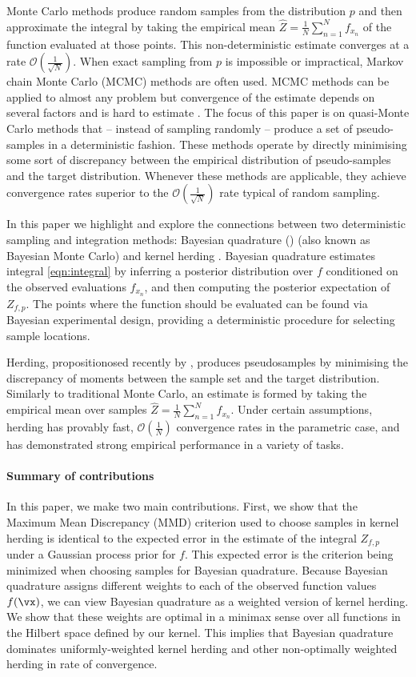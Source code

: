 Monte Carlo methods produce random samples from the distribution $p$ and then approximate the integral by taking the empirical mean $\hat{Z} = \frac{1}{N}\sum_{n=1}^{N}f_{x_n}$ of the function evaluated at those points. This non-deterministic estimate converges at a rate $\mathcal{O}(\frac{1}{\sqrt{N}})$. When exact sampling from $p$ is impossible or impractical, Markov chain Monte Carlo (MCMC) methods are often used. MCMC methods can be applied to almost any problem but convergence of the estimate depends on several factors and is hard to estimate \citep{CowlesCarlin96}. The focus of this paper is on quasi-Monte Carlo methods that -- instead of sampling randomly -- produce a set of pseudo-samples in a deterministic fashion. These methods operate by directly minimising some sort of discrepancy between the empirical distribution of pseudo-samples and the target distribution. Whenever these methods are applicable, they achieve convergence rates superior to the $\mathcal{O}(\frac{1}{\sqrt{N}})$ rate typical of random sampling.

In this paper we highlight and explore the connections between two deterministic sampling and integration methods: Bayesian quadrature (\bq{}) \citep{BZHermiteQuadrature,BZMonteCarlo} (also known as Bayesian Monte Carlo) and kernel herding \citep{chen2010super}. Bayesian quadrature estimates integral \eqref{eqn:integral} by inferring a posterior distribution over $f$ conditioned on the observed evaluations $f_{x_n}$, and then computing the posterior expectation of $Z_{f,p}$. The points where the function should be evaluated can be found via Bayesian experimental design, providing a deterministic procedure for selecting sample locations.

Herding, propositionosed recently by \cite{chen2010super}, produces pseudosamples by minimising the discrepancy of moments between the sample set and the target distribution. Similarly to traditional Monte Carlo, an estimate is formed by taking the empirical mean over samples $\hat{Z} = \frac{1}{N}\sum_{n=1}^{N}f_{x_n}$. Under certain assumptions, herding has provably fast, $\mathcal{O}(\frac{1}{N})$ convergence rates in the parametric case, and has demonstrated strong empirical performance in a variety of tasks.

\paragraph{Summary of contributions} In this paper, we make two main contributions.  First, we show that the Maximum Mean Discrepancy (MMD) criterion used to choose samples in kernel herding is identical to the expected error in the estimate of the integral $Z_{f,p}$ under a Gaussian process prior for $f$.  This expected error is the criterion being minimized when choosing samples for Bayesian quadrature.  Because Bayesian quadrature assigns different weights to each of the observed function values $f(\vx)$, we can view Bayesian quadrature as a weighted version of kernel herding.  We show that these weights are optimal in a minimax sense over all functions in the Hilbert space defined by our kernel.  This implies that Bayesian quadrature dominates uniformly-weighted kernel herding and other non-optimally weighted herding in rate of convergence.

